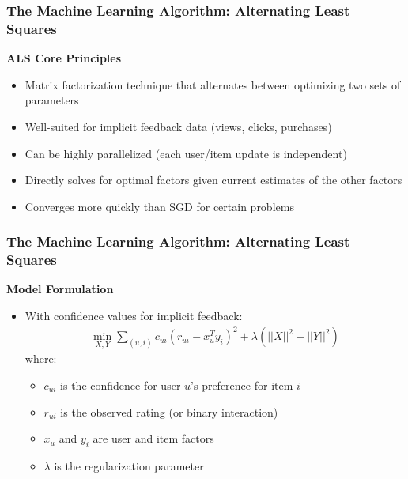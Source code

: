 \documentclass{beamer}
\begin{document}
\begin{frame}
\frametitle{The Machine Learning Algorithm: Alternating Least Squares}

\textbf{ALS Core Principles}
\begin{itemize}
    \item Matrix factorization technique that alternates between optimizing two sets of parameters
    \item Well-suited for implicit feedback data (views, clicks, purchases)
    \item Can be highly parallelized (each user/item update is independent)
    \item Directly solves for optimal factors given current estimates of the other factors
    \item Converges more quickly than SGD for certain problems
\end{itemize}
\end{frame}

\begin{frame}
\frametitle{The Machine Learning Algorithm: Alternating Least Squares}
\textbf{Model Formulation}
\begin{itemize}
    \item With confidence values for implicit feedback:
    \begin{align*}
    \min_{X,Y} \sum_{(u,i)} c_{ui}(r_{ui} - x_u^T y_i)^2 + \lambda(||X||^2 + ||Y||^2)
    \end{align*}
    where:
    \begin{itemize}
        \item $c_{ui}$ is the confidence for user $u$'s preference for item $i$
        \item $r_{ui}$ is the observed rating (or binary interaction)
        \item $x_u$ and $y_i$ are user and item factors
        \item $\lambda$ is the regularization parameter
    \end{itemize}
\end{itemize}
\end{frame}
\end{document}
